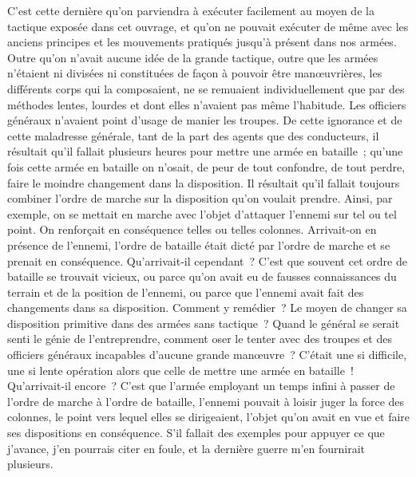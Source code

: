 \documentclass[french,twoside]{book} %
\begin{document}
C’est cette dernière qu’on parviendra à exécuter facilement au moyen de la tactique exposée dans cet ouvrage, et qu’on ne pouvait exécuter de même avec les anciens principes et les mouvements pratiqués jusqu’à présent dans nos armées. Outre qu’on n’avait aucune idée de la grande tactique, outre que les armées n’étaient ni divisées ni constituées de façon à pouvoir être manœuvrières, les différents corps qui la composaient, ne se remuaient individuellement que par des méthodes lentes, lourdes et dont elles n’avaient pas même l’habitude. Les officiers généraux n’avaient point d’usage de manier les troupes. De cette ignorance et de cette maladresse générale, tant de la part des agents que des conducteurs, il résultait qu’il fallait plusieurs heures pour mettre une armée en bataille ; qu’une fois cette armée en bataille on n’osait, de peur de tout confondre, de tout perdre, faire le moindre changement dans la disposition. Il résultait qu’il fallait toujours combiner l’ordre de marche sur la disposition qu’on voulait prendre. Ainsi, par exemple, on se mettait en marche avec l’objet d’attaquer l’ennemi sur tel ou tel point. On renforçait en conséquence telles ou telles colonnes. Arrivait-on en présence de l’ennemi, l’ordre de bataille était dicté par l’ordre de marche et se prenait en conséquence. Qu’arrivait-il cependant ? C’est que souvent cet ordre de bataille se trouvait vicieux, ou parce qu’on avait eu de fausses connaissances du terrain et de la position de l’ennemi, ou parce que l’ennemi avait fait des changements dans sa disposition. Comment y remédier ? Le moyen de changer sa disposition primitive dans des armées sans tactique ? Quand le général se serait senti le génie de l’entreprendre, comment oser le tenter avec des troupes et des officiers généraux incapables d’aucune grande manœuvre ? C’était une si difficile, une si lente opération alors que celle de mettre une armée en bataille ! Qu’arrivait-il encore ? C’est que l’armée employant un temps infini à passer de l’ordre de marche à l’ordre de bataille, l’ennemi pouvait à loisir juger la force des colonnes, le point vers lequel elles se dirigeaient, l’objet qu’on avait en vue et faire ses dispositions en conséquence. S’il fallait des exemples pour appuyer ce que j’avance, j’en pourrais citer en foule, et la dernière guerre m’en fournirait plusieurs.\par
\end{document}
